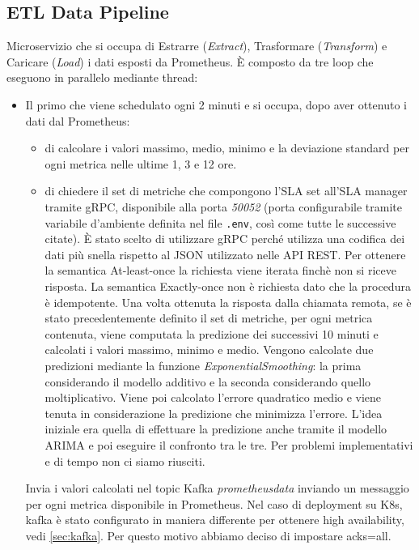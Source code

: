 \documentclass{article}
\begin{document}
    \subsection{ETL Data Pipeline}
    Microservizio che si occupa di Estrarre (\textit{Extract}), Trasformare (\textit{Transform}) e Caricare (\textit{Load}) i dati esposti da Prometheus.  È composto da tre loop che eseguono in parallelo mediante thread:
        \begin{itemize}
            \item Il primo che viene schedulato ogni 2 minuti e si occupa, dopo aver ottenuto i dati dal Prometheus:
            \begin{itemize}
                \item di calcolare i valori massimo, medio, minimo e la deviazione standard per ogni metrica nelle ultime 1, 3 e 12 ore.
                \item di chiedere il set di metriche che compongono l'SLA set all'SLA manager tramite gRPC, disponibile alla porta \textit{50052} (porta configurabile tramite variabile d'ambiente definita nel file \texttt{.env}, così come tutte le successive citate). È stato scelto di utilizzare gRPC perché utilizza una codifica dei dati più snella rispetto al JSON utilizzato nelle API REST. Per ottenere la semantica At-least-once la richiesta viene iterata finchè non si riceve risposta. La semantica Exactly-once non è richiesta dato che la procedura è idempotente. Una volta ottenuta la risposta dalla chiamata remota, se è stato precedentemente definito il set di metriche, per ogni metrica contenuta, viene computata la predizione dei successivi 10 minuti e calcolati i valori massimo, minimo e medio. Vengono calcolate due predizioni mediante la funzione \textit{ExponentialSmoothing}: la prima considerando il modello additivo e la seconda considerando quello moltiplicativo. Viene poi calcolato l'errore quadratico medio e viene tenuta in considerazione la predizione che minimizza l'errore. L'idea iniziale era quella di effettuare la predizione anche tramite il modello ARIMA e poi eseguire il confronto tra le tre. Per problemi implementativi e di tempo non ci siamo riusciti. 
            \end{itemize}
            Invia i valori calcolati nel topic Kafka \textit{prometheusdata} inviando un messaggio per ogni metrica disponibile in Prometheus. Nel caso di deployment su K8s, kafka è stato configurato in maniera differente per ottenere high availability, vedi \ref{sec:kafka}. Per questo motivo abbiamo deciso di impostare acks=all. 
            

\end{itemize}
\end{document}
